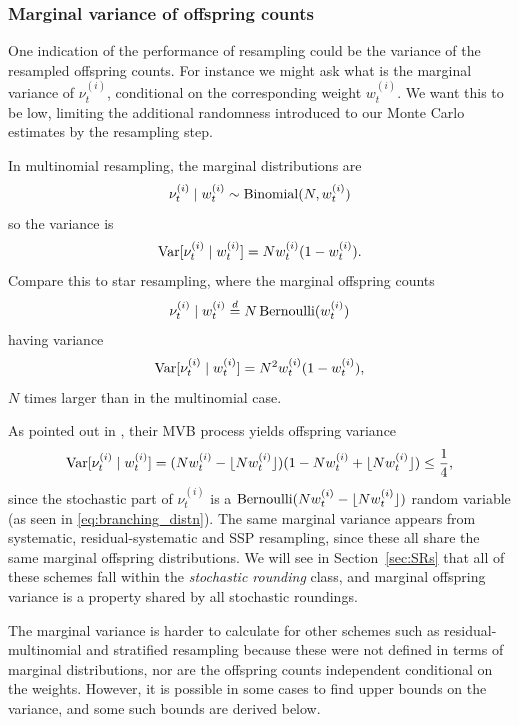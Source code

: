 \subsubsection{Marginal variance of offspring counts}
One indication of the performance of resampling could be the variance of the resampled offspring counts. For instance we might ask what is the marginal variance of $\nu_t^{(i)}$, conditional on the corresponding weight $w_t^{(i)}$. We want this to be low, limiting the additional randomness introduced to our Monte Carlo estimates by the resampling step.

In multinomial resampling, the marginal distributions are
\begin{equation*}
\nu_t^{(i)} \mid w_t^{(i)} 
\sim \operatorname{Binomial}(N, w_t^{(i)})
\end{equation*}
so the variance is
\begin{equation*}
\operatorname{Var}[ \nu_t^{(i)} \mid w_t^{(i)} ]
= N w_t^{(i)} ( 1- w_t^{(i)} ) .
\end{equation*}
Compare this to star resampling, where the marginal offspring counts
\begin{equation*}
\nu_t^{(i)} \mid w_t^{(i)} 
\overset{d}{=} N \operatorname{Bernoulli}( w_t^{(i)} )
\end{equation*}
having variance
\begin{equation*}
\operatorname{Var}[ \nu_t^{(i)} \mid w_t^{(i)} ]
= N^2 w_t^{(i)} ( 1- w_t^{(i)} ) ,
\end{equation*}
$N$ times larger than in the multinomial case.

As pointed out in \textcite[p.557]{crisan1999}, their MVB process yields offspring variance
\begin{equation*}
\operatorname{Var}[ \nu_t^{(i)} \mid w_t^{(i)} ]
= ( Nw_t^{(i)} -\lfloor N w_t^{(i)} \rfloor )(1- Nw_t^{(i)} + \lfloor N w_t^{(i)} \rfloor) 
\leq \frac{1}{4} ,
\end{equation*}
since the stochastic part of $\nu_t^{(i)}$ is a $\operatorname{Bernoulli}( Nw_t^{(i)} -\lfloor N w_t^{(i)} \rfloor )$ random variable (as seen in \eqref{eq:branching_distn}).
The same marginal variance appears from systematic, residual-systematic and SSP resampling, since these all share the same marginal offspring distributions. We will see in Section~\ref{sec:SRs} that all of these schemes fall within the \emph{stochastic rounding} class, and marginal offspring variance is a property shared by all stochastic roundings.

The marginal variance is harder to calculate for other schemes such as residual-multi\-nomial and stratified resampling because these were not defined in terms of marginal distributions, nor are the offspring counts independent conditional on the weights.
However, it is possible in some cases to find upper bounds on the variance, and some such bounds are derived below.

